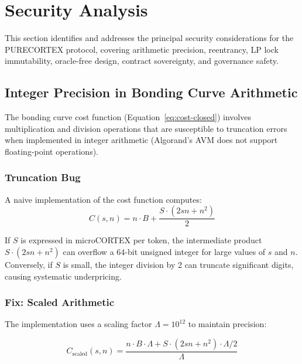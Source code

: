 \section{Security Analysis}
\label{sec:security}

This section identifies and addresses the principal security considerations for
the PURECORTEX protocol, covering arithmetic precision, reentrancy, LP lock
immutability, oracle-free design, contract sovereignty, and governance safety.

\subsection{Integer Precision in Bonding Curve Arithmetic}
\label{subsec:precision}

The bonding curve cost function (Equation~\eqref{eq:cost-closed}) involves
multiplication and division operations that are susceptible to truncation
errors when implemented in integer arithmetic (Algorand's AVM does not support
floating-point operations).

\subsubsection{Truncation Bug}

A naive implementation of the cost function computes:
\begin{equation}
  C(s, n) = n \cdot B + \frac{S \cdot (2sn + n^2)}{2}
  \label{eq:naive-cost}
\end{equation}

If $S$ is expressed in microCORTEX per token, the intermediate product
$S \cdot (2sn + n^2)$ can overflow a 64-bit unsigned integer for large values
of $s$ and $n$. Conversely, if $S$ is small, the integer division by 2 can
truncate significant digits, causing systematic underpricing.

\subsubsection{Fix: Scaled Arithmetic}

The implementation uses a scaling factor $\Lambda = 10^{12}$ to maintain
precision:

\begin{equation}
  C_{\text{scaled}}(s, n) = \frac{n \cdot B \cdot \Lambda + S \cdot (2sn + n^2) \cdot \Lambda / 2}{\Lambda}
  \label{eq:scaled-cost}
\end{equation}

